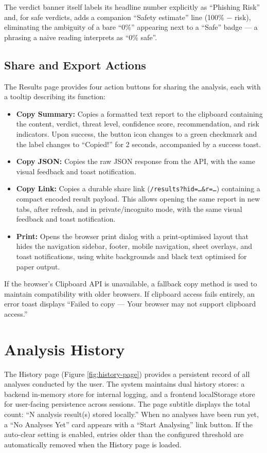 The verdict banner itself labels its headline number explicitly as
``Phishing Risk'' and, for safe verdicts, adds a companion
``Safety estimate'' line (100\% $-$ risk), eliminating the ambiguity of
a bare ``0\%'' appearing next to a ``Safe'' badge --- a phrasing a
naive reading interprets as ``0\% safe''.

\subsection{Share and Export Actions}

The Results page provides four action buttons for sharing the analysis, each with a tooltip describing its function:
\begin{itemize}
\item \textbf{Copy Summary:} Copies a formatted text report to the clipboard containing the content, verdict, threat level, confidence score, recommendation, and risk indicators. Upon success, the button icon changes to a green checkmark and the label changes to ``Copied!'' for 2 seconds, accompanied by a success toast.
\item \textbf{Copy JSON:} Copies the raw JSON response from the API, with the same visual feedback and toast notification.
\item \textbf{Copy Link:} Copies a durable share link (\texttt{/results?hid=\ldots\&r=\ldots}) containing a compact encoded result payload. This allows opening the same report in new tabs, after refresh, and in private/incognito mode, with the same visual feedback and toast notification.
\item \textbf{Print:} Opens the browser print dialog with a print-optimised layout that hides the navigation sidebar, footer, mobile navigation, sheet overlays, and toast notifications, using white backgrounds and black text optimised for paper output.
\end{itemize}

If the browser's Clipboard API is unavailable, a fallback copy method is used to maintain compatibility with older browsers. If clipboard access fails entirely, an error toast displays ``Failed to copy --- Your browser may not support clipboard access.''

\section{Analysis History}
\label{sec:history}

The History page (Figure \ref{fig:history-page}) provides a persistent record of all analyses conducted by the user. The system maintains dual history stores: a backend in-memory store for internal logging, and a frontend localStorage store for user-facing persistence across sessions. The page subtitle displays the total count: ``N analysis result(s) stored locally.'' When no analyses have been run yet, a ``No Analyses Yet'' card appears with a ``Start Analysing'' link button. If the auto-clear setting is enabled, entries older than the configured threshold are automatically removed when the History page is loaded.

